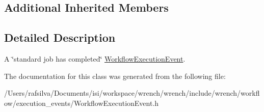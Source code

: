 \subsection*{Additional Inherited Members}


\subsection{Detailed Description}
A \char`\"{}standard job has completed\char`\"{} \hyperlink{classwrench_1_1_workflow_execution_event}{Workflow\+Execution\+Event}. 

The documentation for this class was generated from the following file\+:\begin{DoxyCompactItemize}
\item 
/\+Users/rafsilva/\+Documents/isi/workspace/wrench/wrench/include/wrench/workflow/execution\+\_\+events/Workflow\+Execution\+Event.\+h\end{DoxyCompactItemize}
